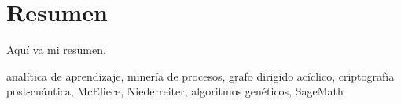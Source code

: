 \chapter*{Resumen}

Aquí va mi resumen.

\small{ analítica de aprendizaje, \; minería de procesos, \; grafo dirigido acíclico, \; criptografía post-cuántica, \; McEliece, \; Niederreiter, \; algoritmos genéticos, \; SageMath}

\newpage